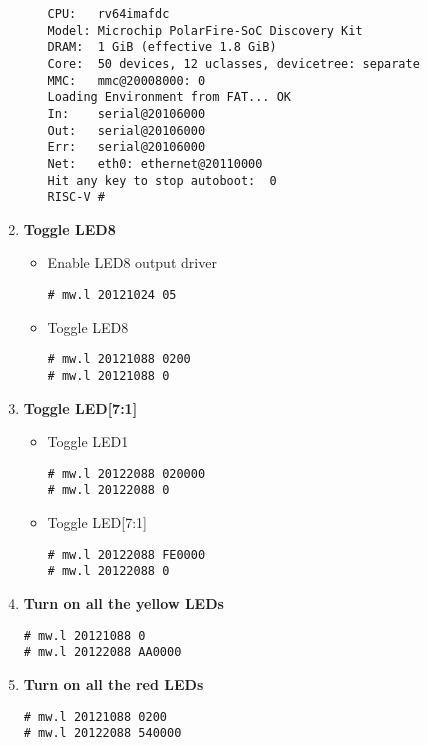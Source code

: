 \begin{enumerate}
\begin{itemize}
\begin{verbatim}
CPU:   rv64imafdc
Model: Microchip PolarFire-SoC Discovery Kit
DRAM:  1 GiB (effective 1.8 GiB)
Core:  50 devices, 12 uclasses, devicetree: separate
MMC:   mmc@20008000: 0
Loading Environment from FAT... OK
In:    serial@20106000
Out:   serial@20106000
Err:   serial@20106000
Net:   eth0: ethernet@20110000
Hit any key to stop autoboot:  0
RISC-V #
\end{verbatim}
\end{itemize}
%
\item \textbf{Toggle LED8}
%
\begin{itemize}
\item Enable LED8 output driver
\begin{verbatim}
# mw.l 20121024 05
\end{verbatim}
%
\item Toggle LED8
\begin{verbatim}
# mw.l 20121088 0200
# mw.l 20121088 0
\end{verbatim}
\end{itemize}
%
\item \textbf{Toggle LED[7:1]}
%
\begin{itemize}
\item Toggle LED1
\begin{verbatim}
# mw.l 20122088 020000
# mw.l 20122088 0
\end{verbatim}
%
\item Toggle LED[7:1]
\begin{verbatim}
# mw.l 20122088 FE0000
# mw.l 20122088 0
\end{verbatim}
\end{itemize}
%
\item \textbf{Turn on all the yellow LEDs}
%
\begin{verbatim}
# mw.l 20121088 0
# mw.l 20122088 AA0000
\end{verbatim}
%
\item \textbf{Turn on all the red LEDs}
%
\begin{verbatim}
# mw.l 20121088 0200
# mw.l 20122088 540000
\end{verbatim}
%
%
\end{enumerate}
